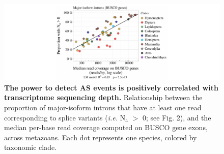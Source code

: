 \begin{figure}[t]   
    \begin{center}                                                                       
        \includegraphics[width=\textwidth] {Figure2_supp.pdf}
    \end{center}                                                                       
    \caption[The power to detect AS events is positively correlated with transcriptome sequencing depth]{\textbf{The power to detect AS events is positively correlated with transcriptome sequencing depth.} Relationship between the proportion of major-isoform introns that have at least one read corresponding to splice variants (\textit{i.e.} $\mathrm{N_a}$ $>$ 0; see Fig. 2), and the median per-base read coverage computed on BUSCO gene exons, across metazoans. Each dot represents one species, colored by taxonomic clade.} 
    \label{supp_fig:AS2}
\end{figure}



